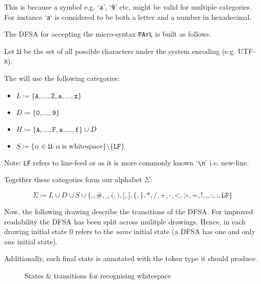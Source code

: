 \documentclass[article]{uom-coursework}
\begin{document}
This is because a symbol e.g. `\texttt{a}',
`\texttt{9}' etc, might be valid for multiple
categories. For instance `\texttt{a}` is
considered to be both a letter and a number in
hexadecimal.

The DFSA for accepting the micro-syntax
\texttt{PArL} is built as follows.

Let $\mathfrak{U}$ be the set of all possible
characters under the system encoding (e.g. UTF-8).

The will use the following categories:

\begin{itemize}
    \item $L \coloneq \{
        \texttt{A},\ldots,\texttt{Z},\texttt{a},\ldots,\texttt{z}\}$
    \item $D \coloneq
        \{\texttt{0},\ldots,\texttt{9}\}$
    \item $H \coloneq
        \{\texttt{A},\ldots,\texttt{F},\texttt{a},\ldots,\texttt{f}\}
        \cup D$
    \item $S \coloneq \{\alpha \in \mathfrak{U}
        \colon \alpha\ \text{is
    whitespace}\}\setminus\{\texttt{LF}\}$
\end{itemize}

Note: \texttt{LF} refers to line-feed or as it is
more commonly known `\texttt{\textbackslash n}'
i.e. new-line.

Together these categories form our alphabet
$\Sigma$:

$$\Sigma \coloneq L \cup D \cup S \cup
\{\texttt{.},\texttt{\#},\texttt{\_},\texttt{(},\texttt{)},\texttt{[},\texttt{]},\texttt{\{},\texttt{\}},\texttt{*},\texttt{/},\texttt{+},\texttt{-},\texttt{<},\texttt{>},\texttt{=},\texttt{!},\texttt{,},\texttt{:},\texttt{;},\texttt{LF}\}$$

Now, the following drawing describe the
transitions of the DFSA. For improved readability
the DFSA has been split across mulitple drawings.
Hence, in each drawing  initial state $0$ refers
to the \emph{same} initial state (a DFSA has one
and only one initial state).

Additionally, each final state is annotated with
the token type it should produce.


\begin{figure}[H]
\centering
{}
\caption{States \& transitions for recognising
whitespace}
\end{figure}
\end{document}
